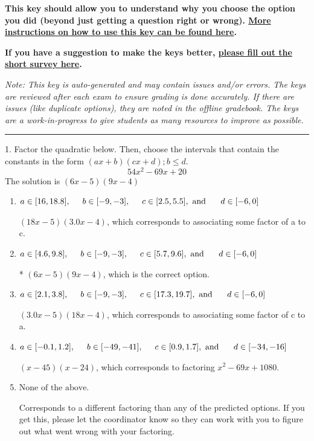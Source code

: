 \documentclass{extbook}[14pt]
\begin{document}
\textbf{This key should allow you to understand why you choose the option you did (beyond just getting a question right or wrong). \href{https://xronos.clas.ufl.edu/mac1105spring2020/courseDescriptionAndMisc/Exams/LearningFromResults}{More instructions on how to use this key can be found here}.}

\textbf{If you have a suggestion to make the keys better, \href{https://forms.gle/CZkbZmPbC9XALEE88}{please fill out the short survey here}.}

\textit{Note: This key is auto-generated and may contain issues and/or errors. The keys are reviewed after each exam to ensure grading is done accurately. If there are issues (like duplicate options), they are noted in the offline gradebook. The keys are a work-in-progress to give students as many resources to improve as possible.}

\rule{\textwidth}{0.4pt}

1. Factor the quadratic below. Then, choose the intervals that contain the constants in the form $(ax+b)(cx+d); b \leq d.$
\[ 54x^{2} -69 x + 20 \] 
The solution is $ (6x -5)(9x -4) $ 

\begin{enumerate}[label=\Alph*.] 
\item $ a \in [16, 18.8], \hspace*{5mm} b \in [-9, -3], \hspace*{5mm} c \in [2.5, 5.5], \text{ and } \hspace*{5mm} d \in [-6, 0] $ 

  $(18x -5)(3.0x -4)$, which corresponds to associating some factor of a to c. 
\item $ a \in [4.6, 9.8], \hspace*{5mm} b \in [-9, -3], \hspace*{5mm} c \in [5.7, 9.6], \text{ and } \hspace*{5mm} d \in [-6, 0] $ 

 * $(6x -5)(9x -4)$, which is the correct option. 
\item $ a \in [2.1, 3.8], \hspace*{5mm} b \in [-9, -3], \hspace*{5mm} c \in [17.3, 19.7], \text{ and } \hspace*{5mm} d \in [-6, 0] $ 

  $(3.0x -5)(18x -4)$, which corresponds to associating some factor of c to a. 
\item $ a \in [-0.1, 1.2], \hspace*{5mm} b \in [-49, -41], \hspace*{5mm} c \in [0.9, 1.7], \text{ and } \hspace*{5mm} d \in [-34, -16] $ 

  $(x -45)(x -24)$, which corresponds to factoring $x^{2} -69 x + 1080$. 
\item $ \text{None of the above.} $ 

  Corresponds to a different factoring than any of the predicted options. If you get this, please let the coordinator know so they can work with you to figure out what went wrong with your factoring. 
\end{enumerate} 
 
\end{document}
